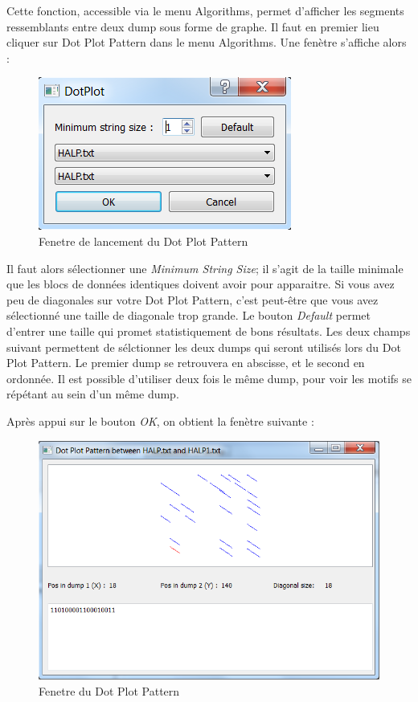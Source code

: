 Cette fonction, accessible via le menu Algorithms, permet d'afficher les segments ressemblants entre deux dump sous forme de graphe. Il faut en premier lieu cliquer sur Dot Plot Pattern dans le menu Algorithms. Une fenètre s'affiche alors :

\begin{figure}[!h]
  \begin{center}
  \includegraphics[scale=1]{dotplotdialog.png}
  \caption{Fenetre de lancement du Dot Plot Pattern}
  \label{dotplotdialog}
  \end{center}
\end{figure}

Il faut alors sélectionner une \emph{Minimum String Size}; il s'agit de la taille minimale que les blocs de données identiques doivent avoir pour apparaitre. Si vous avez peu de diagonales sur votre Dot Plot Pattern, c'est peut-être que vous avez sélectionné une taille de diagonale trop grande. Le bouton \emph{Default} permet d'entrer une taille qui promet statistiquement de bons résultats.
Les deux champs suivant permettent de sélctionner les deux dumps qui seront utilisés lors du Dot Plot Pattern. Le premier dump se retrouvera en abscisse, et le second en ordonnée. Il est possible d'utiliser deux fois le même dump, pour voir les motifs se répétant au sein d'un même dump.

Après appui sur le bouton \emph{OK}, on obtient la fenètre suivante :
\begin{figure}[!h]
  \begin{center}
  \includegraphics[scale=1]{dotplotpatternview.png}
  \caption{Fenetre du Dot Plot Pattern}
  \label{dotplotpattern}
  \end{center}
\end{figure}

